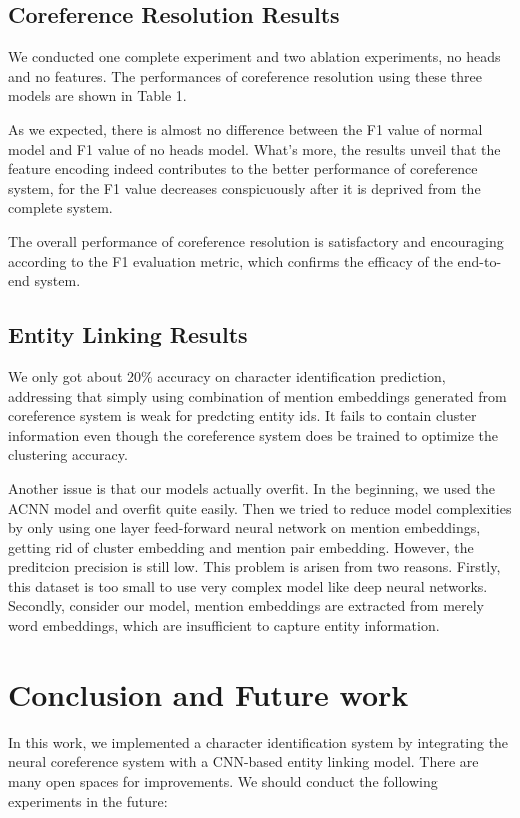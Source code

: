 \documentclass[11pt]{article}
\begin{document}
\subsection{Coreference Resolution Results}
We conducted one complete experiment and two ablation experiments, no heads and no features. The performances of coreference resolution using these three models are shown in Table 1. 

As we expected, there is almost no difference between the F1 value of normal model and F1 value of no heads model. What's more, the results unveil that the feature encoding indeed contributes to the better performance of coreference system, for the F1 value decreases conspicuously after it is deprived from the complete system. 

The overall performance of coreference resolution is satisfactory and encouraging according to the F1 evaluation metric, which confirms the efficacy of the end-to-end system.

\subsection{Entity Linking Results}
We only got about 20\% accuracy on character identification prediction, addressing that simply using combination of mention embeddings generated from coreference system is weak for predcting entity ids. It fails to contain cluster information even though the coreference system does be trained to optimize the clustering accuracy. 

Another issue is that our models actually overfit. In the beginning, we used the ACNN model and overfit quite easily. Then we tried to reduce model complexities by only using one layer feed-forward neural network on mention embeddings, getting rid of cluster embedding and mention pair embedding. However, the preditcion precision is still low. This problem is arisen from two reasons. Firstly, this dataset is too small to use very complex model like deep neural networks. Secondly, consider our model, mention embeddings are extracted from merely word embeddings, which are insufficient to capture entity information.

\section{Conclusion and Future work}

In this work, we implemented a character identification system by integrating the neural coreference system with a CNN-based entity linking model. There are many open spaces for improvements. We should conduct the following experiments in the future:
\end{document}
